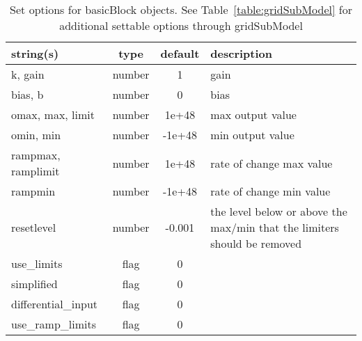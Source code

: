 \begin{table}[ht]
\centering
\begin{tabular}{p{5cm} c c p{7cm}}
\hline
string(s) & type & default & description \\
\hline
k, gain & number & 1 & gain\\
bias, b & number & 0 & bias\\
omax, max, limit & number & 1e+48 & max output value\\
omin, min & number & -1e+48 & min output value\\
rampmax, ramplimit & number & 1e+48 & rate of change max value\\
rampmin & number & -1e+48 & rate of change min value\\
resetlevel & number & -0.001 & the level below or above the max/min that the limiters should be removed\\
use\_limits & flag & 0 & \\
simplified & flag & 0 & \\
differential\_input & flag & 0 & \\
use\_ramp\_limits & flag & 0 & \\
\hline
\end{tabular}
\caption{Set options for basicBlock objects. See Table~\ref{table:gridSubModel} for additional settable options through gridSubModel}
\label{table:basicBlock}
\end{table}

